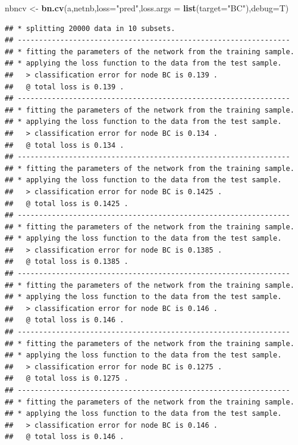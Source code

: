 \documentclass[]{article}
\newenvironment{Shaded}{\begin{snugshade}}{\end{snugshade}}
\newcommand{\KeywordTok}[1]{\textcolor[rgb]{0.13,0.29,0.53}{\textbf{{#1}}}}
\newcommand{\DataTypeTok}[1]{\textcolor[rgb]{0.13,0.29,0.53}{{#1}}}
\newcommand{\StringTok}[1]{\textcolor[rgb]{0.31,0.60,0.02}{{#1}}}
\newcommand{\NormalTok}[1]{{#1}}
\begin{document}
\begin{Shaded}
\begin{Highlighting}[]
\NormalTok{nbncv <-}\StringTok{ }\KeywordTok{bn.cv}\NormalTok{(a,netnb,}\DataTypeTok{loss=}\StringTok{"pred"}\NormalTok{,}\DataTypeTok{loss.args =} \KeywordTok{list}\NormalTok{(}\DataTypeTok{target=}\StringTok{"BC"}\NormalTok{),}\DataTypeTok{debug=}\NormalTok{T)}
\end{Highlighting}
\end{Shaded}

\begin{verbatim}
## * splitting 20000 data in 10 subsets.
## ----------------------------------------------------------------
## * fitting the parameters of the network from the training sample.
## * applying the loss function to the data from the test sample.
##   > classification error for node BC is 0.139 .
##   @ total loss is 0.139 .
## ----------------------------------------------------------------
## * fitting the parameters of the network from the training sample.
## * applying the loss function to the data from the test sample.
##   > classification error for node BC is 0.134 .
##   @ total loss is 0.134 .
## ----------------------------------------------------------------
## * fitting the parameters of the network from the training sample.
## * applying the loss function to the data from the test sample.
##   > classification error for node BC is 0.1425 .
##   @ total loss is 0.1425 .
## ----------------------------------------------------------------
## * fitting the parameters of the network from the training sample.
## * applying the loss function to the data from the test sample.
##   > classification error for node BC is 0.1385 .
##   @ total loss is 0.1385 .
## ----------------------------------------------------------------
## * fitting the parameters of the network from the training sample.
## * applying the loss function to the data from the test sample.
##   > classification error for node BC is 0.146 .
##   @ total loss is 0.146 .
## ----------------------------------------------------------------
## * fitting the parameters of the network from the training sample.
## * applying the loss function to the data from the test sample.
##   > classification error for node BC is 0.1275 .
##   @ total loss is 0.1275 .
## ----------------------------------------------------------------
## * fitting the parameters of the network from the training sample.
## * applying the loss function to the data from the test sample.
##   > classification error for node BC is 0.146 .
##   @ total loss is 0.146 .

\end{verbatim}
\end{document}
